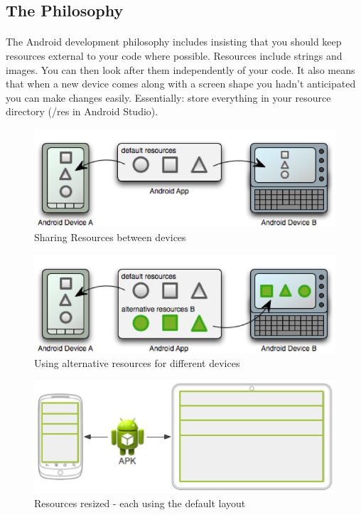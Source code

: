 \documentclass[12pt, a4paper, twoside]{book}
\begin{document}
\subsection{The Philosophy}

\paragraph{} The Android development philosophy includes insisting that you should keep resources external to your code where possible. Resources include strings and images. You can then look after them independently of your code. It also means that when a new device comes along with a screen shape you hadn’t anticipated you can make changes easily. Essentially: store everything in your resource directory (/res in Android Studio).


\begin{figure}[H]%
\centering
\includegraphics[width=\textwidth]{images/res_sharing}
\caption{Sharing Resources between devices}
\label{fig:res_sharing}
\end{figure}

\begin{figure}[H]%
\centering
\includegraphics[width=\textwidth]{images/res_separate}
\caption{Using alternative resources for different devices}
\label{fig:res_separate}
\end{figure}


\begin{figure}[H]%
\centering
\includegraphics[width=\textwidth]{images/res-layout-default}
\caption{Resources resized - each using the default layout}
\label{fig:res-layout-defaultt}
\end{figure}
\end{document}
